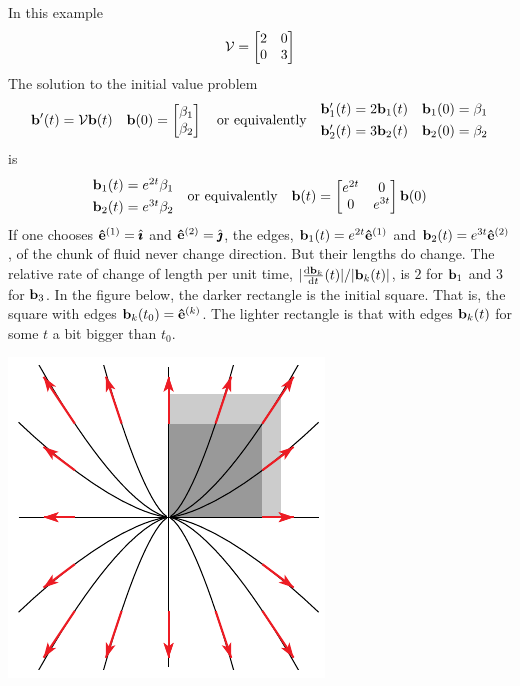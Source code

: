 \begin{eg}[$\vv(x,y)= 2x\hi+3y\hj$]\label{eg:flowExpand}
In this example
\begin{equation*}
\mathcal{V}=\left[\begin{matrix}2&0\\ 0&3\end{matrix}\right]
\end{equation*}
The solution to the initial value problem
\begin{equation*}
\mathbf{b}'(t)=\mathcal{V}\mathbf{b}(t)\quad 
      \mathbf{b}(0)=\left[\begin{matrix}\beta_1\cr\beta_2\end{matrix}\right]
\quad\text{or equivalently}\quad
\begin{matrix}\mathbf{b}_1'(t)=2\mathbf{b}_1(t) & \mathbf{b}_1(0)=\beta_1\\[0.05in]
        \mathbf{b}_2'(t)=3\mathbf{b}_2(t) & \mathbf{b}_2(0)=\beta_2\end{matrix}
\end{equation*}
is
\begin{equation*}
\begin{matrix}\mathbf{b}_1(t)=e^{2t}\beta_1\\[0.05in]
        \mathbf{b}_2(t)=e^{3t}\beta_2\end{matrix}
\quad\text{or equivalently}\quad
\mathbf{b}(t)=\left[\begin{matrix}e^{2t}&0\\ 0&e^{3t}\end{matrix}\right]\mathbf{b}(0)
\end{equation*}
If one chooses $\mathbf{\hat e}^{(1)}=\hat{\pmb{\imath}}$ and $\mathbf{\hat e}^{(2)}=\hat{\pmb{\jmath}}$, the edges, 
$\mathbf{b}_1(t)=e^{2t}\mathbf{\hat e}^{(1)}$ and  $\mathbf{b}_2(t)=e^{3t}\mathbf{\hat e}^{(2)}$, of the chunk of
fluid never change direction. But their lengths do change. The relative rate
of change of length per unit time, $|\diff{\vb_k}{t}(t)|/|\vb_k(t)|$, 
is $2$ for $\mathbf{b}_1$ and 3 for $\mathbf{b}_3$. In the figure below, the darker
rectangle is the initial square. That is, the square with edges $\mathbf{b}_k(t_0)=\mathbf{\hat e}^{(k)}$.
The lighter rectangle is that with edges $\mathbf{b}_k(t)$ for some $t$ a bit
bigger than $t_0$.

\begin{nfig}
\begin{center}
    \includegraphics{square1.pdf}
\end{center}
\end{nfig}

\end{eg}
